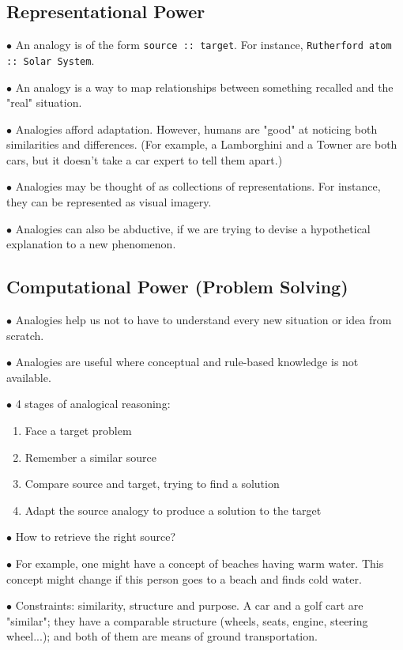 \documentclass[english,openany]{book}
\begin{document}
\subsection{Representational Power}

$\bullet$ An analogy is of the form \texttt{source :: target}. For instance, \texttt{Rutherford atom :: Solar System}.

$\bullet$ An analogy is a way to map relationships between something recalled and the "real" situation.

$\bullet$ Analogies afford adaptation. However, humans are "good" at noticing both similarities and differences. (For example, a Lamborghini and a Towner are both cars, but it doesn't take a car expert to tell them apart.)

$\bullet$ Analogies may be thought of as collections of representations. For instance, they can be represented as visual imagery.

$\bullet$ Analogies can also be abductive, if we are trying to devise a hypothetical explanation to a new phenomenon.

\subsection{Computational Power (Problem Solving)}

$\bullet$ Analogies help us not to have to understand every new situation or idea from scratch.

$\bullet$ Analogies are useful where conceptual and rule-based knowledge is not available.

$\bullet$ 4 stages of analogical reasoning:

\begin{enumerate}
    \item Face a target problem
    \item Remember a similar source
    \item Compare source and target, trying to find a solution
    \item Adapt the source analogy to produce a solution to the target
\end{enumerate}

$\bullet$ How to retrieve the right source?

$\bullet$ For example, one might have a concept of beaches having warm water. This concept might change if this person goes to a beach and finds cold water.

$\bullet$ Constraints: similarity, structure and purpose. A car and a golf cart are "similar"; they have a comparable structure (wheels, seats, engine, steering wheel...); and both of them are means of ground transportation.
\end{document}
